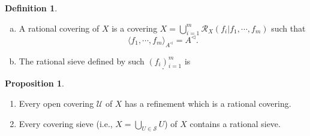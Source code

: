 \documentclass[10pt]{article}
\numberwithin{equation}{section}
\theoremstyle{definition}
\newtheorem{proposition}{Proposition}[subsection]
\newtheorem{definition}{Definition}[subsection]
\newcommand{\U}[0]{\mathcal{U}}
\newcommand{\cR}[0]{\mathcal{R}}
\newcommand{\sep}[0]{\:|\:}
\newcommand{\sS}[0]{\mathscr{S}}
\begin{document}
\begin{definition}$\:$
    \begin{enumerate}[a.]
        \item A rational covering of $X$ is a covering $X = \bigcup_{i=1}^m\cR_X(f_i|f_1,\cdots,f_m)$ such that
        \begin{equation*}
            \langle f_1,\cdots,f_m\rangle_{A^\triangleleft} = A^\triangleleft.
        \end{equation*}
        \item The rational sieve defined by such $(f_i)_{i=1}^m$ is
        \begin{equation*}
            [\mathcal{R}(f_i|f_1,\cdots,f_m)\sep i=1,\cdots,m].
        \end{equation*}
    \end{enumerate}
\end{definition}

\begin{proposition}
    \label{proposition_23_2}
    $\:$
    \begin{enumerate}
        \item Every open covering $\U$ of $X$ has a refinement which is a rational covering.
        \item Every covering sieve (i.e., $X=\bigcup_{U\in\sS}U$) of $X$ contains a rational sieve.
    \end{enumerate}
\end{proposition}
\end{document}
